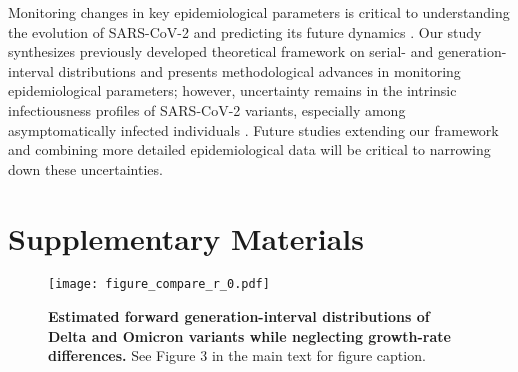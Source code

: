 \documentclass[12pt]{article}
\begin{document}
Monitoring changes in key epidemiological parameters is critical to understanding the evolution of SARS-CoV-2 and predicting its future dynamics \citep{kraemer2021monitoring}.
Our study synthesizes previously developed theoretical framework on serial- and generation-interval distributions and presents methodological advances in monitoring epidemiological parameters;
however, uncertainty remains in the intrinsic infectiousness profiles of SARS-CoV-2 variants, especially among asymptomatically infected individuals \citep{park2020time}.
Future studies extending our framework and combining more detailed epidemiological data will be critical to narrowing down these uncertainties.

\pagebreak

\section*{Supplementary Materials}
\setcounter{figure}{0}
\renewcommand{\thefigure}{S\arabic{figure}}

\begin{figure}[!th]
\texttt{[image: figure\_compare\_r\_0.pdf]}
\caption{
\textbf{Estimated forward generation-interval distributions of Delta and Omicron variants while neglecting growth-rate differences.}
See Figure 3 in the main text for figure caption.
}
\end{figure}

\pagebreak


\end{document}
